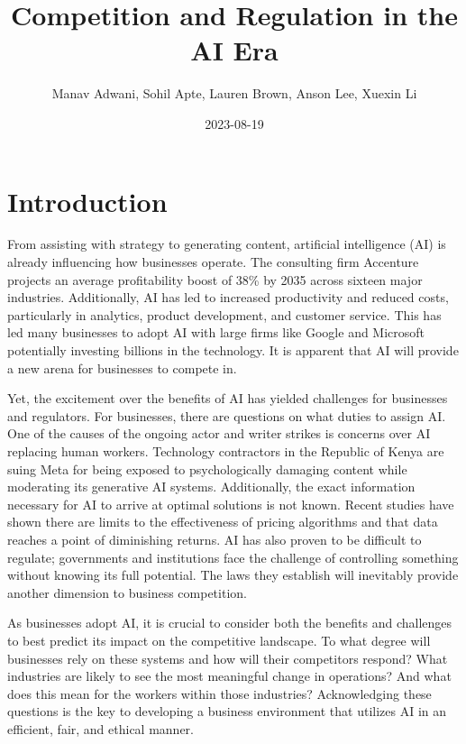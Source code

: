 \documentclass[
]{book}
\title{Competition and Regulation in the AI Era}
\author{Manav Adwani, Sohil Apte, Lauren Brown, Anson Lee, Xuexin Li}
\date{2023-08-19}
\begin{document}
\maketitle

{
\setcounter{tocdepth}{1}
\tableofcontents
}
\hypertarget{introduction}{%
\chapter{Introduction}\label{introduction}}

From assisting with strategy to generating content, artificial intelligence (AI) is already influencing how businesses operate. The consulting firm Accenture projects an average profitability boost of 38\% by 2035 across sixteen major industries. Additionally, AI has led to increased productivity and reduced costs, particularly in analytics, product development, and customer service. This has led many businesses to adopt AI with large firms like Google and Microsoft potentially investing billions in the technology. It is apparent that AI will provide a new arena for businesses to compete in.

Yet, the excitement over the benefits of AI has yielded challenges for businesses and regulators. For businesses, there are questions on what duties to assign AI. One of the causes of the ongoing actor and writer strikes is concerns over AI replacing human workers. Technology contractors in the Republic of Kenya are suing Meta for being exposed to psychologically damaging content while moderating its generative AI systems. Additionally, the exact information necessary for AI to arrive at optimal solutions is not known. Recent studies have shown there are limits to the effectiveness of pricing algorithms and that data reaches a point of diminishing returns. AI has also proven to be difficult to regulate; governments and institutions face the challenge of controlling something without knowing its full potential. The laws they establish will inevitably provide another dimension to business competition.

As businesses adopt AI, it is crucial to consider both the benefits and challenges to best predict its impact on the competitive landscape. To what degree will businesses rely on these systems and how will their competitors respond? What industries are likely to see the most meaningful change in operations? And what does this mean for the workers within those industries? Acknowledging these questions is the key to developing a business environment that utilizes AI in an efficient, fair, and ethical manner.
\end{document}
